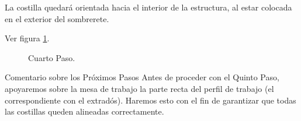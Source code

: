 La costilla quedará orientada hacia el interior de la estructura, al estar colocada en el exterior del sombrerete.

Ver figura \ref{fig:cua}.

\begin{figure}[!htb]
\centering
{}
\caption{Cuarto Paso. \label{fig:cua}}
\end{figure}

\begin{nota}{Comentario sobre los Próximos Pasos}{}
    Antes de proceder con el Quinto Paso, apoyaremos sobre la mesa de trabajo la parte recta del perfil de trabajo (el correspondiente con el extradós). Haremos esto con el fin de garantizar que todas las costillas queden alineadas correctamente.
\end{nota}

